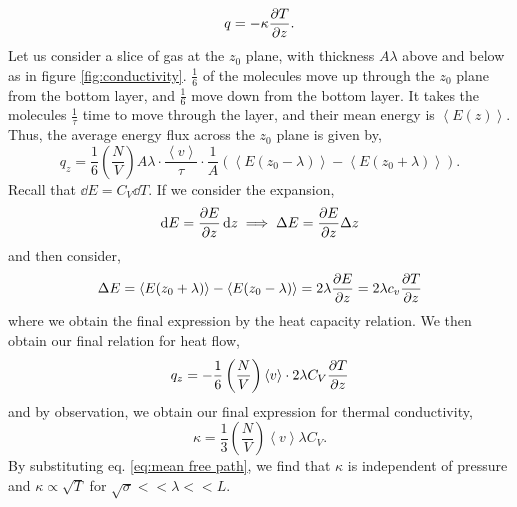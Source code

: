 \documentclass{book}
\begin{document}
\begin{equation}
	q = -\kappa \pdv{T}{z}.
\end{equation}
Let us consider a slice of gas at the $z_0$ plane, with thickness $A\lambda$ above and below as in figure \ref{fig:conductivity}. $\frac{1}{6}$ of the molecules move up through the $z_0$ plane from the bottom layer, and $\frac{1}{6}$ move down from the bottom layer. It takes the molecules $\frac{1}{\tau}$ time to move through the layer, and their mean energy is $\left<E(z)\right>$. Thus, the average energy flux across the $z_0$ plane is given by,
\begin{equation}
	q_z = \frac{1}{6}\left(\frac{N}{V}\right)A\lambda \cdot \frac{\left<v\right>}{\tau} \cdot \frac{1}{A} \left(\left<E(z_0 - \lambda)\right> - \left<E(z_0 + \lambda)\right>\right).
\end{equation} 
Recall that $\dd{E} = C_V \dd{T}$. If we consider the expansion,
\begin{equation}
	\dd{E} = \pdv{E}{z} \dd{z} \implies \Delta E = \pdv{E}{z} \Delta z
\end{equation}
and then consider,
\begin{equation}
	\Delta E = \left<E(z_0 + \lambda)\right> - \left<E(z_0 - \lambda)\right> = 2\lambda\pdv{E}{z} = 2\lambda c_v \pdv{T}{z}
\end{equation}
where we obtain the final expression by the heat capacity relation. We then obtain our final relation for heat flow,
\begin{equation}
	q_z = -\frac{1}{6}\left(\frac{N}{V}\right)\left<v\right>\cdot 2\lambda C_V\pdv{T}{z}
\end{equation}
and by observation, we obtain our final expression for thermal conductivity,
\begin{equation}
	\kappa = \frac{1}{3}\left(\frac{N}{V}\right)\left<v\right>\lambda C_V.
\end{equation}
By substituting eq. \eqref{eq:mean free path}, we find that $\kappa$ is independent of pressure and $\kappa \propto \sqrt{T}$ for $\sqrt{\sigma} << \lambda << L$.
\end{document}
